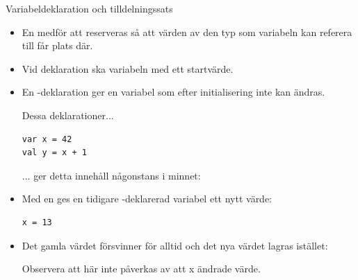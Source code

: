 \documentclass{simpleslides}
\begin{document}


\begin{Slide}{Variabeldeklaration och tilldelningssats}\SlideFontTiny

\begin{itemize}
\item En  medför att  reserveras så att värden av den typ som variabeln kan referera till får plats där.

\item Vid deklaration ska variabeln  med ett startvärde.

\item En -deklaration ger en variabel som efter initialisering inte kan ändras.


\begin{multicols}{2}
Dessa deklarationer...
\begin{lstlisting}
var x = 42
val y = x + 1
\end{lstlisting}
... ger detta innehåll någonstans i minnet:



\end{multicols}


\item Med en  ges en tidigare -deklarerad variabel ett nytt värde:
\begin{lstlisting}
x = 13
\end{lstlisting}

\item Det gamla värdet försvinner för alltid och det nya värdet lagras istället: \\

Observera att  här inte påverkas av att x ändrade värde.
\end{itemize}
\end{Slide}
    
\end{document}
